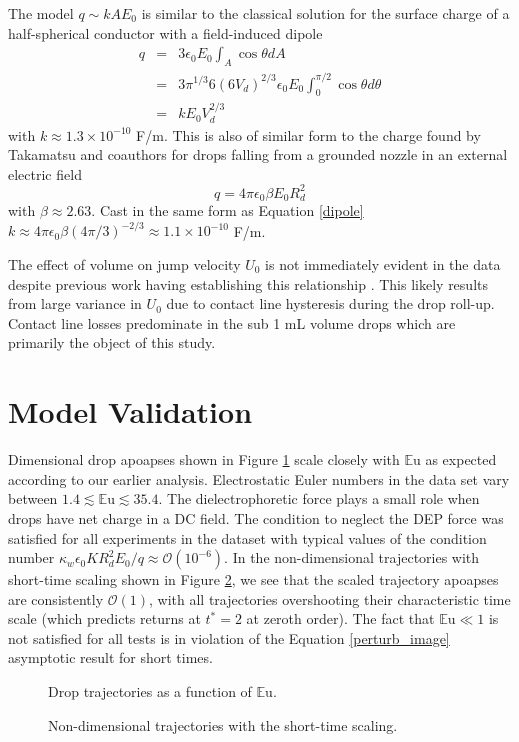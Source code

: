 \documentclass[12pt,a4paper,oneside]{book}
\begin{document}
The model $q \sim kAE_0$ is similar to the classical solution for the surface charge of a half-spherical conductor with a field-induced dipole \cite{david_j._griffiths_introduction_1999}
\begin{eqnarray}
q &=& 3 \epsilon_0 E_0 \int_A \cos \theta dA \nonumber \\
&=& 3 \pi^{1/3} 6 \left(6 V_d \right)^{2/3} \epsilon_0 E_0 \int^{\pi / 2}_{0} \!\!\!\!\! \cos \theta d\theta \nonumber \\
&=& k E_0 V_d^{2/3} \label{dipole}
\end{eqnarray}
with $k \approx 1.3 \times 10^{-10}$ F/m. This is also of similar form to the charge found by Takamatsu and coauthors for drops falling from a grounded nozzle in an external electric field \cite{takamatsu_theoretical_1981}
\[q = 4 \pi \epsilon_0 \beta E_0 R_d^2 \]
with $\beta \approx 2.63$. Cast in the same form as Equation \ref{dipole} $k \approx 4 \pi \epsilon_0 \beta (4 \pi/3)^{-2/3} \approx 1.1 \times 10^{-10}$ F/m.

The effect of volume on jump velocity $U_0$ is not immediately evident in the data despite previous work having establishing this relationship \cite{attari_puddle_2016}. This likely results from large variance in $U_0$ due to contact line hysteresis during the drop roll-up. Contact line losses predominate in the sub 1 mL volume drops which are primarily the object of this study.  

\section{Model Validation}
Dimensional drop apoapses shown in Figure \ref{fig:series_s_eu} scale closely with $\mathbb{E}\mbox{u}$ as expected according to our earlier analysis. Electrostatic Euler numbers in the data set vary between $1.4 \lesssim \mathbb{E}\mbox{u} \lesssim 35.4$. The dielectrophoretic force plays a small role when drops have net charge in a DC field. The condition to neglect the DEP force was satisfied for all experiments in the dataset with typical values of the condition number $\kappa_w \epsilon_0 K R_d^2 E_0/q \approx \mathcal{O}(10^{-6})$. In the non-dimensional trajectories with short-time scaling shown in Figure \ref{fig:series_s_ds}, we see that the scaled trajectory apoapses are consistently $\mathcal{O}(1)$, with all trajectories overshooting their characteristic time scale (which predicts returns at $t^*  =2$ at zeroth order). The fact that $\mathbb{E}\mbox{u} \ll 1$ is not satisfied for all tests is in violation of the Equation \ref{perturb_image} asymptotic result for short times.
\begin{figure}[!htb]
    \centering
    
    \caption{Drop trajectories as a function of $\mathbb{E}\mbox{u}$.\label{fig:series_s_eu}}
\end{figure}
\begin{figure}[htb]
    \centering
    
    \caption{Non-dimensional trajectories with the short-time scaling.\label{fig:series_s_ds}}
\end{figure}
\end{document}
